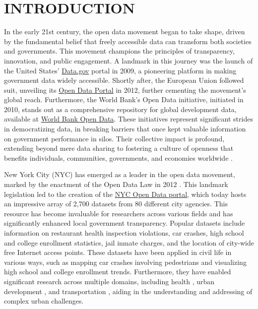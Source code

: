 \documentclass[linenumber]{jdsart}
\begin{document}
\section{INTRODUCTION} 
\label{sec:intro}

In the early 21st century, the open data movement began 
to take shape, driven by the fundamental belief that 
freely accessible data can transform both societies and 
governments. This movement champions the principles
of transparency, innovation, and public engagement. 
A landmark in this journey was the launch of the United States'
\href{https://www.data.gov}{Data.gov} portal in 2009, a pioneering
platform in making government data widely accessible. Shortly after,
the European Union followed suit, unveiling its
\href{https://data.europa.eu/euodp}{Open Data Portal} in 2012, further
cementing the movement's global reach. Furthermore, the World Bank's Open
Data initiative, initiated in 2010, stands out as a comprehensive
repository for global development data, available at
\href{https://data.worldbank.org}{World Bank Open Data}. 
These initiatives represent significant strides in democratizing data, 
in breaking barriers that once kept valuable information 
on government performance in silos. Their collective impact 
is profound, extending beyond mere data sharing to 
fostering a culture of openness that benefits individuals, 
communities, governments, and economies worldwide 
\citep{barns2016mine, wang2016adoption}.


New York City (NYC) has emerged as a leader in the open data movement,
marked by the enactment of the Open Data Law in 2012
\citep{zuiderwijk2014open}. This landmark legislation led to the
creation of the \href{https://opendata.cityofnewyork.us}{NYC Open Data
  portal}, which today hosts an impressive array of 2,700 datasets
from 80 different city agencies. This resource has become invaluable
for researchers across various fields and has significantly enhanced
local government transparency. Popular datasets include information on
restaurant health inspection violations, car crashes, high school and
college enrollment statistics, jail inmate charges, and the location
of city-wide free Internet access points. These datasets have been
applied in civil life in various ways, such as mapping car crashes
involving pedestrians and visualizing high school and college
enrollment trends. Furthermore, they have enabled significant research
across multiple domains, including health \citep{cantor2018facets,
  shankar2021data}, urban development \citep{neves2020impacts}, and
transportation \citep{gerte2019understanding}, aiding in the
understanding and addressing of complex urban challenges.
\end{document}
